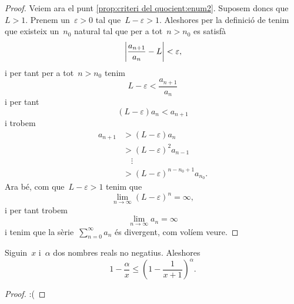 \documentclass[../../main.tex]{subfiles}
\begin{document}
\begin{proposition}
\begin{proof}
            Veiem ara el punt \eqref{prop:criteri del quocient:enum2}.
            Suposem doncs que~\(L>1\).
            Prenem un~\(\varepsilon>0\) tal que~\(L-\varepsilon>1\).
            Aleshores per la definició de  tenim que existeix un~\(n_{0}\) natural tal que per a tot~\(n>n_{0}\) es satisfà
            \[
                \abs{\frac{a_{n+1}}{a_{n}}-L}<\varepsilon,
            \]
            i per tant per a tot~\(n>n_{0}\) tenim
            \[
                L-\varepsilon<\frac{a_{n+1}}{a_{n}}
            \]
            i per tant
            \[
                (L-\varepsilon)a_{n}<a_{n+1}
            \]
            i trobem
            \begin{align*}
                a_{n+1}&>(L-\varepsilon)a_{n}\\
                &>(L-\varepsilon)^{2}a_{n-1}\\
                &\quad\vdots\\
                &>(L-\varepsilon)^{n-n_{0}+1}a_{n_{0}}.
            \end{align*}
            Ara bé, com que~\(L-\varepsilon>1\) tenim que
            \[
                \lim_{n\to\infty}(L-\varepsilon)^{n}=\infty,
            \]
            i per tant trobem
            \[
                \lim_{n\to\infty}a_{n}=\infty
            \]
            i tenim que la sèrie~\(\sum_{n=0}^{\infty}a_{n}\) és divergent, com volíem veure.
        \end{proof}
    \end{proposition}
    \begin{lemma}
        \label{lema:criteri de Raabe}
        Siguin~\(x\) i~\(\alpha\) dos nombres reals no negatius.
        Aleshores
        \[
            1-\frac{\alpha}{x}\leq\left(1-\frac{1}{x+1}\right)^{\alpha}.
        \]
        \begin{proof}
        :(
        \end{proof}
    \end{lemma}
\end{document}
